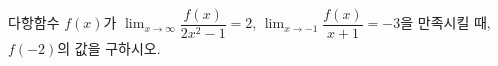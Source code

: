 다항함수 $f(x)$가 $\displaystyle\lim_{x\to\infty}\dfrac{f(x)}{2x^2-1}=2$, $\displaystyle\lim_{x\to -1}\dfrac{f(x)}{x+1}=-3$을 만족시킬 때, $f(-2)$의 값을 구하시오.
